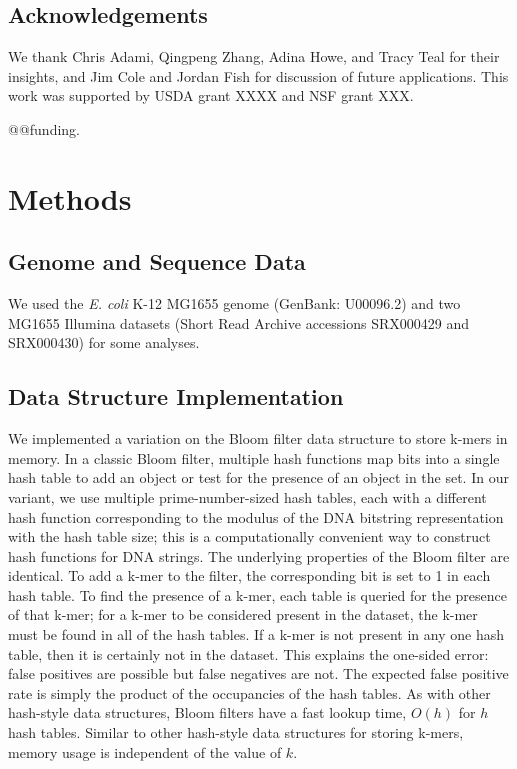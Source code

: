 \documentclass[12pt]{article} \usepackage{simplemargins}
\begin{document}
\subsection{Acknowledgements}

We thank Chris Adami, Qingpeng Zhang, Adina Howe, and Tracy Teal for
their insights, and Jim Cole and Jordan Fish for discussion of future
applications.  This work was supported by USDA grant XXXX and NSF
grant XXX.

@@funding.

\section{Methods}

\subsection{Genome and Sequence Data}
We used the \emph{E. coli} K-12 MG1655 genome (GenBank: U00096.2) and two MG1655 Illumina 
datasets (Short Read Archive accessions SRX000429 and SRX000430) for some
analyses. 

\subsection{Data Structure Implementation}
We implemented a variation on the Bloom filter data structure to store
k-mers in memory. In a classic Bloom filter, multiple hash functions
map bits into a single hash table to add an object or test for the presence
of an object in the set. In our variant, we use multiple
prime-number-sized hash tables, each with a different hash
function corresponding to the modulus of the DNA bitstring
representation with the hash table size; this is a computationally convenient way to construct hash functions for DNA strings.  The underlying properties of
the Bloom filter are identical.  To add a k-mer to the
filter, the corresponding bit is set to 1 in each hash table.  To find
the presence of a k-mer, each table is queried for the presence of
that k-mer; for a k-mer to be considered present in the dataset, the
k-mer must be found in all of the hash tables.  If a k-mer is not
present in any one hash table, then it is certainly not in the
dataset. This explains the one-sided error: false positives are
possible but false negatives are not. The expected false positive rate
is simply the product of the occupancies of the hash tables.  As with
other hash-style data structures, Bloom filters have a fast lookup
time, $O(h)$ for $h$ hash tables.  Similar to other hash-style data
structures for storing k-mers, memory usage is independent of the
value of $k$.
\end{document}
